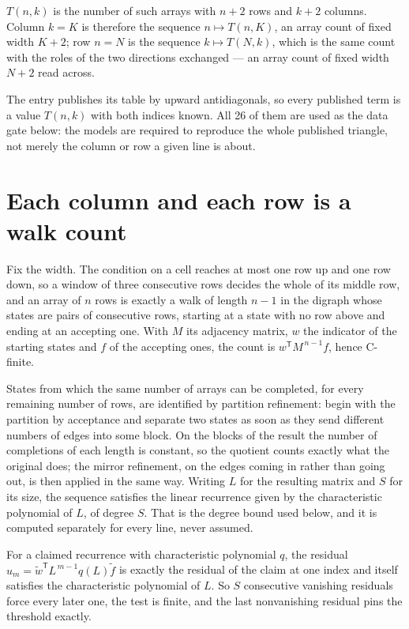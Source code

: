 \documentclass[11pt]{article}
\theoremstyle{definition}
\begin{document}
$T(n,k)$ is the number of such arrays with $n + 2$ rows and $k + 2$ columns. Column $k = K$ is therefore the sequence $n \mapsto T(n,K)$, an array count of fixed width $K + 2$; row $n = N$ is the sequence $k \mapsto T(N,k)$, which is the same count with the roles of the two directions exchanged --- an array count of fixed width $N + 2$ read across.

The entry publishes its table by upward antidiagonals, so every published term is a value $T(n,k)$ with both indices known. All 26 of them are used as the data gate below: the models are required to reproduce the whole published triangle, not merely the column or row a given line is about.

\section{Each column and each row is a walk count}

Fix the width. The condition on a cell reaches at most one row up and one row down, so a window of three consecutive rows decides the whole of its middle row, and an array of $n$ rows is exactly a walk of length $n-1$ in the digraph whose states are pairs of consecutive rows, starting at a state with no row above and ending at an accepting one. With $M$ its adjacency matrix, $w$ the indicator of the starting states and $f$ of the accepting ones, the count is $w^{\mathsf T}M^{\,n-1}f$, hence C-finite.

States from which the same number of arrays can be completed, for every remaining number of rows, are identified by partition refinement: begin with the partition by acceptance and separate two states as soon as they send different numbers of edges into some block. On the blocks of the result the number of completions of each length is constant, so the quotient counts exactly what the original does; the mirror refinement, on the edges coming in rather than going out, is then applied in the same way. Writing $L$ for the resulting matrix and $S$ for its size, the sequence satisfies the linear recurrence given by the characteristic polynomial of $L$, of degree $S$. That is the degree bound used below, and it is computed separately for every line, never assumed.

For a claimed recurrence with characteristic polynomial $q$, the residual $u_m = \tilde w^{\mathsf T}L^{\,m-1}q(L)\tilde f$ is exactly the residual of the claim at one index and itself satisfies the characteristic polynomial of $L$. So $S$ consecutive vanishing residuals force every later one, the test is finite, and the last nonvanishing residual pins the threshold exactly.
\end{document}
